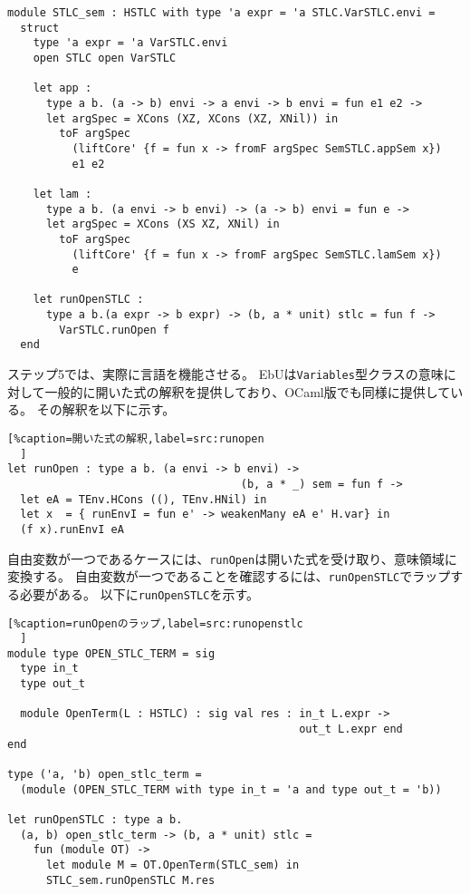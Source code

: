 \documentclass[uplatex]{sumiilab-paper}
\theoremstyle{mystyle}
\numberwithin{definition}{chapter} %
\begin{document}
\begin{lstlisting}[caption=意味モジュールの定義,label=src:lifting_fun]
module STLC_sem : HSTLC with type 'a expr = 'a STLC.VarSTLC.envi = 
  struct 
    type 'a expr = 'a VarSTLC.envi
    open STLC open VarSTLC 
  
    let app : 
      type a b. (a -> b) envi -> a envi -> b envi = fun e1 e2 -> 
      let argSpec = XCons (XZ, XCons (XZ, XNil)) in
        toF argSpec 
          (liftCore' {f = fun x -> fromF argSpec SemSTLC.appSem x}) 
          e1 e2
  
    let lam : 
      type a b. (a envi -> b envi) -> (a -> b) envi = fun e ->
      let argSpec = XCons (XS XZ, XNil) in 
        toF argSpec 
          (liftCore' {f = fun x -> fromF argSpec SemSTLC.lamSem x}) 
          e  

    let runOpenSTLC : 
      type a b.(a expr -> b expr) -> (b, a * unit) stlc = fun f ->
        VarSTLC.runOpen f 
  end 
\end{lstlisting}



ステップ5では、実際に言語を機能させる。
EbUは{\tt Variables}型クラスの意味に対して一般的に開いた式の解釈を提供しており、OCaml版でも同様に提供している。
その解釈を以下に示す。

\begin{lstlisting}[%caption=開いた式の解釈,label=src:runopen
  ]
let runOpen : type a b. (a envi -> b envi) -> 
                                    (b, a * _) sem = fun f -> 
  let eA = TEnv.HCons ((), TEnv.HNil) in 
  let x  = { runEnvI = fun e' -> weakenMany eA e' H.var} in 
  (f x).runEnvI eA 
\end{lstlisting}

自由変数が一つであるケースには、{\tt runOpen}は開いた式を受け取り、意味領域に変換する。
自由変数が一つであることを確認するには、{\tt runOpenSTLC}でラップする必要がある。
以下に{\tt runOpenSTLC}を示す。

\begin{lstlisting}[%caption=runOpenのラップ,label=src:runopenstlc
  ]
module type OPEN_STLC_TERM = sig 
  type in_t 
  type out_t 

  module OpenTerm(L : HSTLC) : sig val res : in_t L.expr -> 
                                             out_t L.expr end 
end 

type ('a, 'b) open_stlc_term = 
  (module (OPEN_STLC_TERM with type in_t = 'a and type out_t = 'b))

let runOpenSTLC : type a b. 
  (a, b) open_stlc_term -> (b, a * unit) stlc = 
    fun (module OT) -> 
      let module M = OT.OpenTerm(STLC_sem) in 
      STLC_sem.runOpenSTLC M.res
\end{lstlisting}
\end{document}
